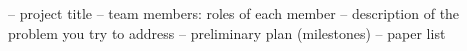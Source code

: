 – project title
– team members: roles of each member
– description of the problem you try to address
– preliminary plan (milestones)
– paper list